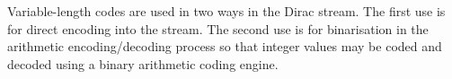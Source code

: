 
Variable-length codes are used in two ways in the Dirac stream. The first
use is for direct encoding into the stream. The second use is for binarisation
in the arithmetic encoding/decoding process so that integer values may be 
coded and decoded using a binary arithmetic coding engine. 

